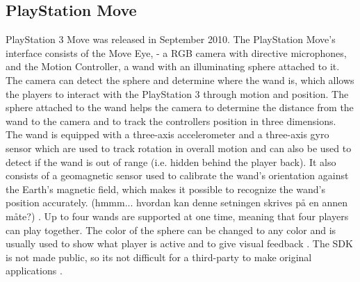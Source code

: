 \subsection{PlayStation Move}
PlayStation 3 Move was released in September 2010. The PlayStation Move’s interface consists of the Move Eye, - a RGB camera with directive microphones,  and the Motion Controller, a wand with an illuminating sphere attached to it. The camera can detect the sphere and determine where the wand is, which allows the players to interact with the PlayStation 3 through motion and position. The sphere attached to the wand helps the camera to determine the distance from the wand to the camera and to track the controllers position in three dimensions. The wand is equipped with a three-axis accelerometer and a three-axis gyro sensor which are used to track rotation in overall motion and can also be used to detect if the wand is out of range (i.e. hidden behind the player back). It also consists of a geomagnetic sensor used to calibrate the wand’s orientation against the Earth’s magnetic field, which makes it possible to recognize the wand’s position accurately.  (hmmm... hvordan kan denne setningen skrives på en annen måte?) \cite{comparison}. Up to four wands are supported at one time, meaning that four players can play together. The color of the sphere can be changed to any color and is usually used to show what player is active and to give visual feedback \cite{ppmove}. The SDK is not made public, so its not difficult for a third-party to make original applications \cite{comparison}. 

